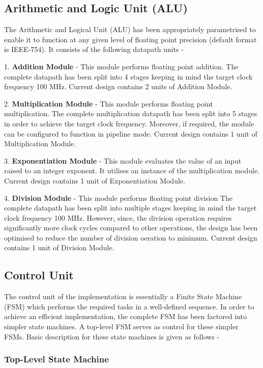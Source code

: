 \subsection{Arithmetic and Logic Unit (ALU)}
The Arithmetic and Logical Unit (ALU) has been appropriately parametrised to enable it to function at any given level of floating point precision (default format is IEEE-754). It consists of the following datapath units -

1. {\bf Addition Module} - This module performs floating point addition. The complete datapath has been split into 4 stages keeping in mind the target clock frequency 100 MHz. Current design contains 2 units of Addition Module.

2. {\bf Multiplication Module} - This module performs floating point multiplication. The complete multiplication datapath has been split into 5 stages in order to achieve the target clock frequency. Moreover, if required, the module can be configured to function in pipeline mode. Current design contains 1 unit of Multiplication Module.

3. {\bf Exponentiation Module} - This module evaluates the value of an input raised to an integer exponent. It utilises an instance of the multiplication module. Current design contains 1 unit of Exponentiation Module.

4. {\bf Division Module} - This module performs floating point division The complete datapath has been split into multiple stages keeping in mind the target clock frequency 100 MHz. However, since, the division operation requires significantly more clock cycles compared to other operations, the design has been optimised to reduce the number of division oeration to minimum. Current design contains 1 unit of Division Module.

\subsection{Control Unit}
The control unit of the implementation is essentially a Finite State Machine (FSM) which performs the required tasks in a well-defined sequence. In order to achieve an efficient implementation, the complete FSM has been factored into simpler state machines. A top-level FSM serves as control for these simpler FSMs. Basic description for these state machines is given as follows -

\subsubsection{Top-Level State Machine}

